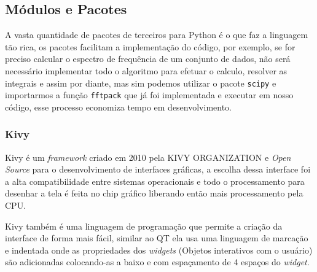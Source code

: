            \begin{quote}
                                                        
            \end{quote}
            
        \subsection{Módulos e Pacotes}
            
            A vasta quantidade de pacotes de terceiros para Python é o que faz a linguagem tão rica, os 
            pacotes facilitam a implementação do código, por exemplo, se for preciso calcular o espectro de 
            frequência de um conjunto de dados, não será necessário implementar todo o algoritmo para efetuar o calculo, resolver as integrais e assim por diante, mas sim podemos utilizar o pacote \verb|scipy| e importarmos a função \verb|fftpack| que já foi implementada e executar em nosso código, esse processo economiza tempo em desenvolvimento.           
            
            \subsubsection{Kivy}
            
            
            \label{lim_kivy}
            Kivy é um \textit{framework} criado em 2010 pela KIVY ORGANIZATION \cite{kivy} e \textit{Open Source} para o desenvolvimento de interfaces gráficas, a escolha dessa interface foi a alta compatibilidade entre sistemas operacionais e todo o processamento para desenhar a tela é feita no chip gráfico liberando então mais processamento pela CPU.
            
            Kivy também é uma linguagem de programação que permite a criação da interface de forma mais fácil, similar ao QT \cite{qt} ela usa uma linguagem de marcação e indentada onde as propriedades dos \textit{widgets} (Objetos interativos com o usuário) são adicionadas colocando-as a baixo e com espaçamento de 4 espaços do \textit{widget}. 
                        
